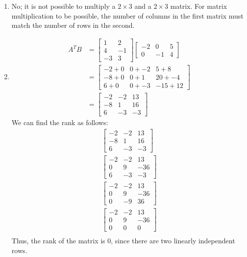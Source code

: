 \documentclass[a4paper]{article}
\begin{document}
\begin{enumerate}[label=(\alph*)]
    \item No; it is not possible to multiply a $2 \times 3$ and a $2 \times 3$ matrix. For matrix multiplication to be possible, the number of columns in the first matrix must match the number of rows in the second.
    \item
        \begin{align*}
            A^TB &= \begin{bmatrix}1&2\\4&-1\\-3&3\end{bmatrix}
            \begin{bmatrix}-2&0&5\\0&-1&4\end{bmatrix} \\
            &= \begin{bmatrix}-2+0&0+-2&5+8\\-8+0&0+1&20+-4\\6+0&0+-3&-15+12\end{bmatrix} \\
            &= \begin{bmatrix}-2&-2&13\\-8&1&16\\6&-3&-3\end{bmatrix}
        \end{align*}
        We can find the rank as follows:
        \begin{align*}
            \begin{bmatrix}-2&-2&13\\-8&1&16\\6&-3&-3\end{bmatrix} \\
            \begin{bmatrix}-2&-2&13\\0&9&-36\\6&-3&-3\end{bmatrix} \\
            \begin{bmatrix}-2&-2&13\\0&9&-36\\0&-9&36\end{bmatrix} \\
            \begin{bmatrix}-2&-2&13\\0&9&-36\\0&0&0\end{bmatrix} \\
        \end{align*}
        Thus, the rank of the matrix is $0$, since there are two linearly independent rows. 
        

\end{enumerate}
\end{document}
